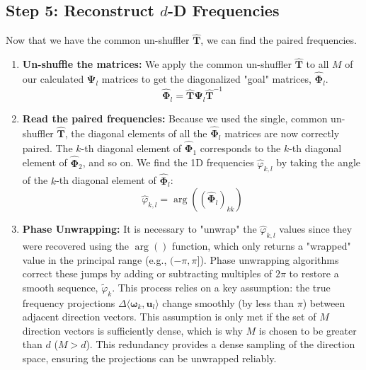 \subsection{Step 5: Reconstruct $d$-D Frequencies}
Now that we have the common un-shuffler $\hat{\mathbf{T}}$, we can find the paired frequencies.
\begin{enumerate}
    \item \textbf{Un-shuffle the matrices:} We apply the common un-shuffler $\hat{\mathbf{T}}$ to all $M$ of our calculated $\mathbf{\Psi}_l$ matrices to get the diagonalized "goal" matrices, $\hat{\mathbf{\Phi}}_l$.
    $$ \hat{\mathbf{\Phi}}_l = \hat{\mathbf{T}} \mathbf{\Psi}_l \hat{\mathbf{T}}^{-1} $$
    
    \item \textbf{Read the paired frequencies:} Because we used the single, common un-shuffler $\hat{\mathbf{T}}$, the diagonal elements of all the $\hat{\mathbf{\Phi}}_l$ matrices are now correctly paired.
    The $k$-th diagonal element of $\hat{\mathbf{\Phi}}_1$ corresponds to the $k$-th diagonal element of $\hat{\mathbf{\Phi}}_2$, and so on.
    We find the 1D frequencies $\hat{\varphi}_{k,l}$ by taking the angle of the $k$-th diagonal element of $\hat{\mathbf{\Phi}}_l$:
    $$ \hat{\varphi}_{k,l} = \arg\left( (\hat{\mathbf{\Phi}}_l)_{kk} \right) $$
    
    \item \textbf{Phase Unwrapping:} It is necessary to "unwrap" the $\hat{\varphi}_{k,l}$ values since they were recovered using the $\arg()$ function, which only returns a "wrapped" value in the principal range (e.g., $(-\pi, \pi]$).   Phase unwrapping algorithms correct these jumps by adding or subtracting multiples of $2\pi$ to restore a smooth sequence, $\tilde{\varphi}_k$. This process relies on a key assumption: the true frequency projections $\Delta \langle \boldsymbol{\omega}_k, \boldsymbol{u}_l \rangle$ change smoothly (by less than $\pi$) between adjacent direction vectors. This assumption is only met if the set of $M$ direction vectors is sufficiently dense, which is why $M$ is chosen to be greater than $d$ ($M > d$). This redundancy provides a dense sampling of the direction space, ensuring the projections can be unwrapped reliably.
    

\end{enumerate}
